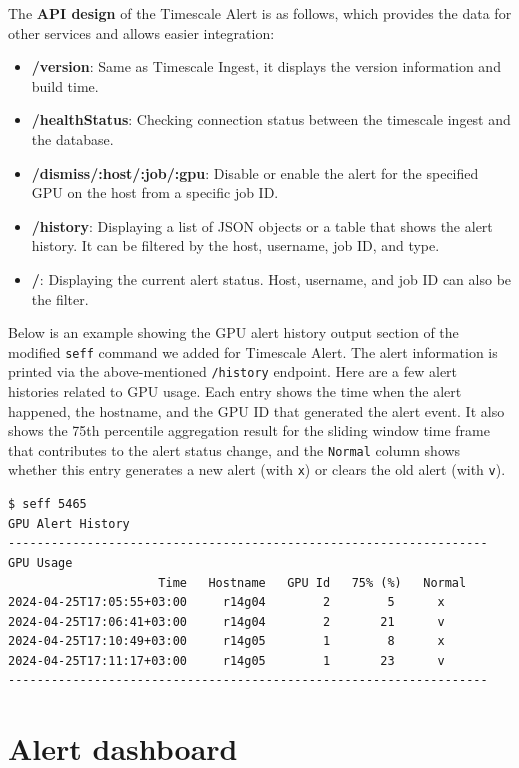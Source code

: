 The \textbf{API design} of the Timescale Alert is as follows, which provides the data for other services and allows easier integration:

\begin{itemize}
    \item \textbf{/version}: Same as Timescale Ingest, it displays the version information and build time.
    \item \textbf{/healthStatus}: Checking connection status between the timescale ingest and the database.
    \item \textbf{/dismiss/:host/:job/:gpu}: Disable or enable the alert for the specified GPU on the host from a specific job ID.
    \item \textbf{/history}: Displaying a list of JSON objects or a table that shows the alert history. It can be filtered by the host, username, job ID, and type.
    \item \textbf{/}: Displaying the current alert status. Host, username, and job ID can also be the filter.
\end{itemize}

Below is an example showing the GPU alert history output section of the modified \texttt{seff} command we added for Timescale Alert. The alert information is printed via the above-mentioned \texttt{/history} endpoint. Here are a few alert histories related to GPU usage. Each entry shows the time when the alert happened, the hostname, and the GPU ID that generated the alert event. It also shows the 75th percentile aggregation result for the sliding window time frame that contributes to the alert status change, and the \texttt{Normal} column shows whether this entry generates a new alert (with \texttt{x}) or clears the old alert (with \texttt{v}).

\begin{lstlisting}
$ seff 5465
GPU Alert History
-------------------------------------------------------------------
GPU Usage
                     Time   Hostname   GPU Id   75% (%)   Normal
2024-04-25T17:05:55+03:00     r14g04        2        5      x
2024-04-25T17:06:41+03:00     r14g04        2       21      v
2024-04-25T17:10:49+03:00     r14g05        1        8      x
2024-04-25T17:11:17+03:00     r14g05        1       23      v
-------------------------------------------------------------------
\end{lstlisting}

\section{Alert dashboard}

